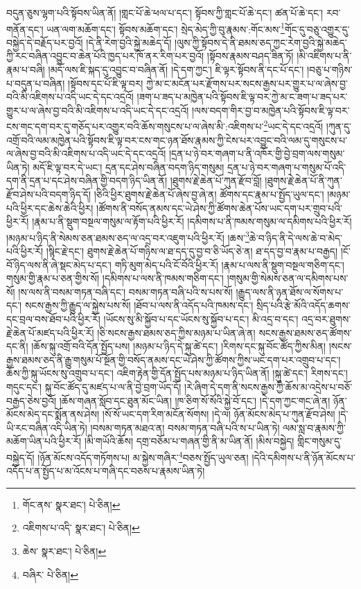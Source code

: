 བདུན་ཅུས་ལྷག་པའི་སྟོབས་ཡིན་ནོ། །གླང་པོ་ཆེ་ཕལ་པ་དང་། སྟོབས་ཀྱི་གླང་པོ་ཆེ་དང་། ཚན་པོ་ཆེ་དང་། རབ་གནོན་དང་། ཡན་ལག་མཆོག་དང་། སྟོབས་མཆོག་དང་། སྲེད་མེད་ཀྱི་བུ་རྣམས་:གོང་མས་\footnote{གོང་ནས་  སྣར་ཐང་།  པེ་ཅིན། }གོང་དུ་བཅུ་འགྱུར་དུ་བསྐྱེད་དེ་བརྗོད་པར་བྱའོ། །དེ་ནི་རེག་བྱའི་སྐྱེ་མཆེད་དོ། །ལུས་ཀྱི་སྟོབས་དེ་ནི་ཐམས་ཅད་ཀྱང་རེག་བྱའི་སྐྱེ་མཆེད་ཀྱི་རང་བཞིན་འབྱུང་བ་ཆེན་པོའི་ཁྱད་པར་ཁོ་ནར་རིག་པར་བྱའོ། །སྟོབས་རྣམས་བཤད་ཟིན་ཏོ། །མི་འཇིགས་པ་ནི་རྣམ་པ་བཞི། །མདོ་ལས་ཇི་སྐད་དུ་འབྱུང་བ་བཞིན་ནོ། །དེ་དག་ཀྱང་། ཇི་ལྟར་སྟོབས་ནི་དང་པོ་དང་། །བཅུ་པ་གཉིས་པ་བདུན་པ་བཞིན། །སྟོབས་དང་པོ་ཇི་ལྟ་བར། ཀྱེ་མ་ང་མངོན་པར་རྫོགས་པར་སངས་རྒྱས་པར་གྱུར་པ་ལ་ཞེས་བྱ་བའི་མི་འཇིགས་པ་འདི་ཡང་དེ་དང་འདྲའོ། །ཟག་པ་ཟད་པ་མཁྱེན་པའི་སྟོབས་ཇི་ལྟ་བར་ཀྱེ་མ་ང་ཟག་པ་ཟད་པར་གྱུར་པ་ལ་ཞེས་བྱ་བའི་མི་འཇིགས་པ་འདི་ཡང་དེ་དང་འདྲའོ། །ལས་བདག་གིར་བྱ་བ་མཁྱེན་པའི་སྟོབས་ཇི་ལྟ་བར་ངས་གང་དག་བར་དུ་གཅོད་པར་འགྱུར་བའི་ཆོས་གསུངས་པ་ལ་ཞེས་མི་:འཇིགས་པ་\footnote{འཇིགས་པ་འདི་  སྣར་ཐང་།  པེ་ཅིན། }ཡང་དེ་དང་འདྲའོ། །ཀུན་དུ་འགྲོ་བའི་ལམ་མཁྱེན་པའི་སྟོབས་ཇི་ལྟ་བར་ངས་གང་ཉན་ཐོས་རྣམས་ཀྱི་ངེས་པར་འབྱུང་བའི་ལམ་དུ་གསུངས་པ་ལ་ཞེས་བྱ་བའི་མི་འཇིགས་པ་འདི་ཡང་དེ་དང་འདྲའོ། །དྲན་པ་ཉེ་བར་གཞག་པ་ནི་འཁོར་གྱི་བྱེ་བྲག་ལས་གསུམ་ཡིན་ཏེ། མདོ་ཇི་ལྟ་བར་དེ་ཡང་། དྲན་དང་ཤེས་བཞིན་བདག་ཉིད་གསུམ། དྲན་པ་ཉེ་བར་གཞག་པ་གསུམ་པོ་འདི་དག་ནི་དྲན་པ་དང་ཤེས་བཞིན་གྱི་བདག་ཉིད་ཡིན་ནོ། །ཐུགས་རྗེ་ཆེན་པོ་ཀུན་རྫོབ་བློ། །ཐུགས་རྗེ་ཆེན་པོ་ནི་ཀུན་རྫོབ་ཤེས་པའི་བདག་ཉིད་དོ། །ཅིའི་ཕྱིར་ཐུགས་རྗེ་ཆེན་པོ་ཞེས་བྱ་ཞེ་ན། ཚོགས་དང་རྣམ་པ་སྤྱོད་ཡུལ་དང་། །མཉམ་པའི་ཕྱིར་དང་ཆེས་ཆེའི་ཕྱིར། །ཚོགས་ནི་བསོད་ནམས་དང་ཡེ་ཤེས་ཀྱི་ཚོགས་ཆེན་པོས་ཡང་དག་པར་གྲུབ་པའི་ཕྱིར་རོ། །རྣམ་པ་ནི་སྡུག་བསྔལ་གསུམ་ལ་རྟོག་པའི་ཕྱིར་རོ། །དམིགས་པ་ནི་ཁམས་གསུམ་ལ་དམིགས་པའི་ཕྱིར་རོ། །མཉམ་པ་ཉིད་ནི་སེམས་ཅན་ཐམས་ཅད་ལ་འདྲ་བར་འཇུག་པའི་ཕྱིར་རོ། །ཆས་\footnote{ཆེས་  སྣར་ཐང་།  པེ་ཅིན། }ཆེ་བ་ཉིད་ནི་དེ་ལས་ཆེ་བ་མེད་པའི་ཕྱིར་རོ། །སྙིང་རྗེ་དང་། ཐུགས་རྗེ་ཆེན་པོ་གཉིས་ལ་ཐ་དད་དུ་བྱ་བ་ཅི་ཡོད་ཅེ་ན། ཐ་དད་བྱ་བ་རྣམ་པ་བརྒྱད། །ངོ་བོ་ཉིད་ལས་ནི་ཞེ་སྡང་མེད་པ་དང་། གཏི་མུག་མེད་པའི་ངོ་བོའི་ཕྱིར་རོ། །རྣམ་པ་ལས་ནི་སྡུག་བསྔལ་གཅིག་དང་། གསུམ་གྱི་རྣམ་པ་ཅན་གྱིས་སོ། །དམིགས་པ་ལས་ནི་ཁམས་གཅིག་དང་། །གསུམ་གྱི་སེམས་ཅན་ལ་དམིགས་པས་སོ། །ས་ལས་ནི་བསམ་གཏན་བཞི་དང་། བསམ་གཏན་བཞི་པའི་ས་པས་སོ། །རྒྱུད་ལས་ནི་ཉན་ཐོས་ལ་སོགས་པ་དང་། སངས་རྒྱས་ཀྱི་རྒྱུད་ལ་སྐྱེས་པས་སོ། །ཐོབ་པ་ལས་ནི་འདོད་པའི་ཁམས་དང་། སྲིད་པའི་རྩེ་མོའི་འདོད་ཆགས་དང་བྲལ་བས་ཐོབ་པའི་ཕྱིར་རོ། །ཡོངས་སུ་མི་སྐྱོབ་པ་དང་ཡོངས་སུ་སྐྱོབ་པ་དང་། མི་འདྲ་བ་དང་། འདྲ་བར་ཐུགས་རྗེ་ཆེན་པོ་མཛད་པའི་ཕྱིར་རོ། །ཅི་སངས་རྒྱས་ཐམས་ཅད་ཀྱིས་མཉམ་པ་ཡིན་ཞེ་ན། སངས་རྒྱས་ཐམས་ཅད་ཚོགས་དང་ནི། །ཆོས་སྐུ་འགྲོ་བའི་དོན་སྤྱོད་པས། །མཉམ་པ་ཉིད་དེ་སྐུ་ཚེ་དང་། །རིགས་དང་སྐུ་བོང་ཚོད་ཀྱིས་མིན། །སངས་རྒྱས་ཐམས་ཅད་ནི་རྒྱུ་གསུམ་པོ་སྔོན་གྱི་བསོད་ནམས་དང་ཡེ་ཤེས་ཀྱི་ཚོགས་ཀྱིས་ཡང་དག་པར་འགྲུབ་པ་དང་། ཆོས་ཀྱི་སྐུ་ཡོངས་སུ་འགྲུབ་པ་དང་། འཇིག་རྟེན་གྱི་དོན་སྤྱོད་པས་མཉམ་པ་ཉིད་ཡིན་ནོ། །སྐུ་ཚེ་དང་། རིགས་དང་། གདུང་དང་། སྐུ་བོང་ཚོད་དུ་མཛད་པ་ལ་ནི་བྱེ་བྲག་ཡོད་དོ། །རེ་ཞིག་དེ་དག་ནི་སངས་རྒྱས་ཀྱི་ཆོས་མ་འདྲེས་པ་བཅོ་བརྒྱད་ཅེས་བྱའོ། །ཆོས་གཞན་སློབ་དང་ཐུན་མོང་ཡིན། །ཁ་ཅིག་སོ་སོའི་སྐྱེ་བོ་དང་། །དེ་དག་ཀྱང་གང་ཞེ་ན། ཉོན་མོངས་མེད་དང་སྨོན་ནས་ཤེས། །སོ་སོ་ཡང་དག་རིག་མངོན་སོགས། །དེ་ལ། ཉོན་མོངས་མེད་པ་ཀུན་རྫོབ་ཤེས། །དེ་ཡི་རང་བཞིན་འདི་ཡིན་ཏེ། །བསམ་གཏན་མཐའ་ན། བསམ་གཏན་བཞི་པའི་ས་པ་ཡིན་ཏེ། ལམ་སླ་བ་རྣམས་ཀྱི་མཆོག་ཡིན་པའི་ཕྱིར་རོ། །མི་གཡོའི་ཆོས། དགྲ་བཅོམ་པ་གཞན་གྱི་ནི་མ་ཡིན་ནོ། །མིས་བསྐྱེད། གླིང་གསུམ་དུ་བསྐྱེད་དོ། །ཉོན་མོངས་འདོད་གཏོགས་པ། མ་སྐྱེས་གཞིར་\footnote{བཞིར་  པེ་ཅིན། }བཅས་སྤྱོད་ཡུལ་ཅན། །དེའི་དམིགས་པ་ནི་ཉོན་མོངས་པ་འདོད་པ་ན་སྤྱོད་པ་མ་འོངས་པ་གཞི་དང་བཅས་པ་རྣམས་ཡིན་ཏེ། 